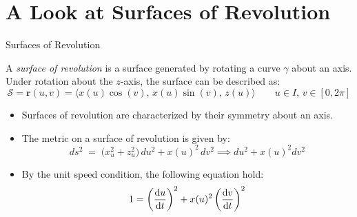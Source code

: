 \documentclass{beamer}
\begin{document}
\section{A Look at Surfaces of Revolution}
\begin{frame}{Surfaces of Revolution}
	\footnotesize
	\begin{definition}\label{def:surface_of_revolution}
		A \emph{surface of revolution} is a surface generated by rotating a curve $\gamma$ about an axis. Under rotation about the $z$-axis, the surface can be described as:
		\[
			\mathcal{S} = \mathbf{r}(u,v) = \bigl\langle x(u)\cos(v),\,x(u)\sin(v),\,z(u)\bigr\rangle \qquad u\in I,\,v\in [0,2\pi]
		\]
	\end{definition}
	\vspace{1ex}
	\begin{itemize}[<+->]
		\item Surfaces of revolution are characterized by their symmetry about an axis.
		\item The metric on a surface of revolution is given by:	
		\[
		    ds^{2} \;=\; \big(x_{u}^{2} + z_{u}^{2}\big)\,du^{2} + x(u)^{2}\,dv^{2} \implies du^{2} + x(u)^{2}dv^{2} 
		\]
		\item By the unit speed condition, the following equation hold:
		\[
			1 = \left(\dv{u}{t}\right)^{2} + x(u)^{2}\left(\dv{v}{t}\right)^{2}
		\]
	\end{itemize}
\end{frame}
\end{document}
